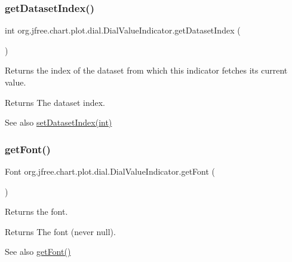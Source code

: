 \subsubsection{\texorpdfstring{get\+Dataset\+Index()}{getDatasetIndex()}}
{\footnotesize\ttfamily int org.\+jfree.\+chart.\+plot.\+dial.\+Dial\+Value\+Indicator.\+get\+Dataset\+Index (\begin{DoxyParamCaption}{ }\end{DoxyParamCaption})}

Returns the index of the dataset from which this indicator fetches its current value.

\begin{DoxyReturn}{Returns}
The dataset index.
\end{DoxyReturn}
\begin{DoxySeeAlso}{See also}
\mbox{\hyperlink{classorg_1_1jfree_1_1chart_1_1plot_1_1dial_1_1_dial_value_indicator_a0880bbfe31f19c02655f9565c9ac9e16}{set\+Dataset\+Index(int)}} 
\end{DoxySeeAlso}
\mbox{\label{classorg_1_1jfree_1_1chart_1_1plot_1_1dial_1_1_dial_value_indicator_a21a668914ec4c335dd57b6026d1b272a}} 
\subsubsection{\texorpdfstring{get\+Font()}{getFont()}}
{\footnotesize\ttfamily Font org.\+jfree.\+chart.\+plot.\+dial.\+Dial\+Value\+Indicator.\+get\+Font (\begin{DoxyParamCaption}{ }\end{DoxyParamCaption})}

Returns the font.

\begin{DoxyReturn}{Returns}
The font (never {\ttfamily null}).
\end{DoxyReturn}
\begin{DoxySeeAlso}{See also}
\mbox{\hyperlink{classorg_1_1jfree_1_1chart_1_1plot_1_1dial_1_1_dial_value_indicator_a21a668914ec4c335dd57b6026d1b272a}{get\+Font()}} 
\end{DoxySeeAlso}
\mbox{\label{classorg_1_1jfree_1_1chart_1_1plot_1_1dial_1_1_dial_value_indicator_a0c511855e967c4f4bca11620ccfd1920}} 
